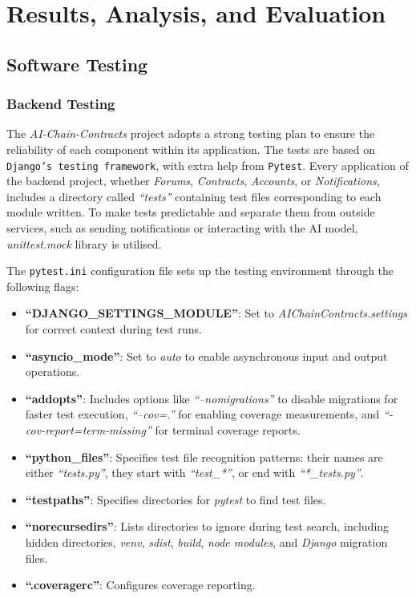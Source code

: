 \chapter{Results, Analysis, and Evaluation}

\section{Software Testing}

\subsection{Backend Testing}

The \textit{AI-Chain-Contracts} project adopts a strong testing plan to ensure the reliability of each component within its application. The tests are based on \texttt{Django's testing framework}, with extra help from \texttt{Pytest}. Every application of the backend project, whether \textit{Forums}, \textit{Contracts}, \textit{Accounts}, or \textit{Notifications}, includes a directory called \textit{``tests''} containing test files corresponding to each module written. To make tests predictable and separate them from outside services, such as sending notifications or interacting with the AI model, \textit{unittest.mock} library is utilised.

The \texttt{pytest.ini} configuration file sets up the testing environment through the following flags:

\begin{itemize}
    \item \textbf{``DJANGO\_SETTINGS\_MODULE''}: Set to \textit{AIChainContracts.settings} for correct context during test runs.
    \item \textbf{``asyncio\_mode''}: Set to \textit{auto} to enable asynchronous input and output operations.
    \item \textbf{``addopts''}: Includes options like \textit{``--nomigrations''} to disable migrations for faster test execution, \textit{``--cov=.''} for enabling coverage measurements, and \textit{``-cov-report=term-missing''} for terminal coverage reports.
    \item \textbf{``python\_files''}: Specifies test file recognition patterns: their names are either \textit{``tests.py''}, they start with \textit{``test\_*''}, or end with \textit{``*\_tests.py''}. 
    \item \textbf{``testpaths''}: Specifies directories for \textit{pytest} to find test files.
    \item \textbf{``norecursedirs''}: Lists directories to ignore during test search, including hidden directories, \textit{venv}, \textit{sdist}, \textit{build}, \textit{node modules}, and \textit{Django} migration files.
    \item \textbf{``.coveragerc''}: Configures coverage reporting.
\end{itemize}

